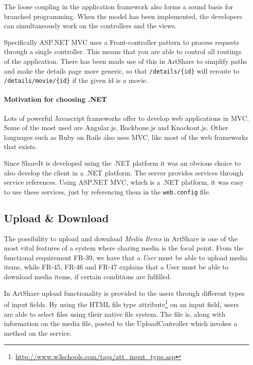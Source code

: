 \documentclass[../report.tex]{subfiles}
\begin{document}
The loose coupling in the application framework also forms a sound basis for branched programming. When the model has been implemented, the developers can simultaneously work on the controllers and the views.

Specifically ASP.NET MVC uses a Front-controller pattern to process requests through a single controller. This means that you are able to control all routings of the application. There has been made use of this in ArtShare to simplify paths and make the details page more generic, so that \texttt{/details/\{id\}} will reroute to \texttt{/details/movie/\{id\}} if the given id is a movie.

\paragraph{Motivation for choosing .NET}
Lots of powerful Javascript frameworks offer to develop web applications in MVC. Some of the most used are Angular.js, Backbone.js and Knockout.js. Other languages such as Ruby on Rails also uses MVC, like most of the web frameworks that exists.

Since ShareIt is developed using the .NET platform it was an obvious choice to also develop the client in a .NET platform. The server provides services through service references. Using ASP.NET MVC, which is a .NET platform, it was easy to use these services, just by referencing them in the \texttt{web.config} file. 

\subsection{Upload \& Download}

The possibility to upload and download \textit{Media Items} in ArtShare is one of the most vital features of a system where sharing media is the focal point. From the functional requirement FR-39, we have that a \textit{User} must be able to upload media items, while FR-45, FR-46 and FR-47 explains that a User must be able to download media items, if certain conditions are fulfilled.

In ArtShare upload functionality is provided to the users through different types of input fields. By using the HTML file type attribute\footnote{\url{http://www.w3schools.com/tags/att\_input\_type.asp}} on an input field, users are able to select files using their native file system. The file is, along with information on the media file, posted to the UploadController which invokes a method on the service.
\end{document}
